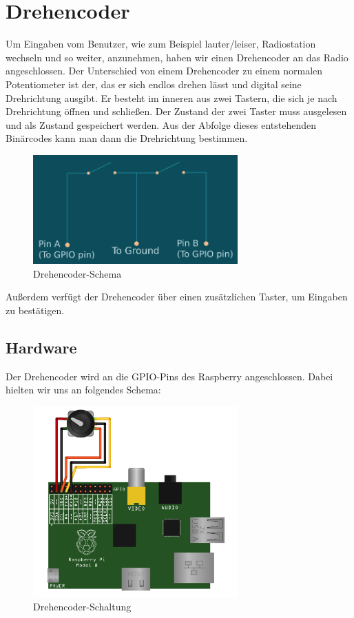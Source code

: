 \section{Drehencoder}
Um Eingaben vom Benutzer, wie zum Beispiel lauter/leiser, Radiostation wechseln und so weiter, anzunehmen, haben wir einen Drehencoder an das Radio angeschlossen.
\newline
Der Unterschied von einem Drehencoder zu einem normalen Potentiometer ist der, das er sich endlos drehen lässt und digital seine Drehrichtung ausgibt.
\newline
Er besteht im inneren aus zwei Tastern, die sich je nach Drehrichtung öffnen und schließen. Der Zustand der zwei Taster muss ausgelesen und als Zustand gespeichert werden. Aus der Abfolge dieses entstehenden Binärcodes kann man dann die Drehrichtung bestimmen.

\begin{figure}[H] 
  \centering
     \includegraphics[width=0.7\textwidth]{Bilder/rotary1.png}
  \caption{Drehencoder-Schema}
  \label{fig:Schema}
\end{figure}

Außerdem verfügt der Drehencoder über einen zusätzlichen Taster, um Eingaben zu bestätigen.


\subsection{Hardware}
Der Drehencoder wird an die GPIO-Pins des Raspberry angeschlossen. Dabei hielten wir uns an folgendes Schema:

\begin{figure}[H] 
  \centering
     \includegraphics[width=0.7\textwidth]{Bilder/rotary2.png}
  \caption{Drehencoder-Schaltung}
  \label{fig:Schaltung}
\end{figure}

